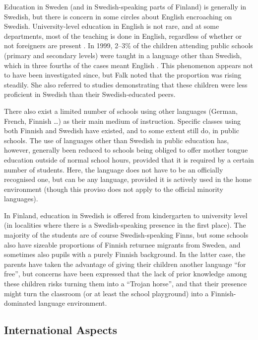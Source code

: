 \begin{multicols}{2}
Education in Sweden (and in Swedish-speaking parts of Finland) is
generally in Swedish, but there is concern in some circles about
English encroaching on Swedish. University-level education in English
is not rare, and at some departments, most of the teaching is done in
English, regardless of whether or not foreigners are present
\cite[25,~29f]{falk2001}. In 1999, 2--3\% of the children attending
public schools (primary and secondary levels) were taught in a
language other than Swedish, which in three fourths of the cases meant
English \cite[18f]{falk2001}. This phenomenon appears not to have been
investigated since, but Falk noted that the proportion was rising
steadily. She also referred to studies \cite[19]{falk2001}
demonstrating that these children were less proficient in Swedish than
their Swedish-educated peers.

There also exist a limited number of schools using other languages
(German, French, Finnish \ldots) as their main medium of
instruction. Specific classes using both Finnish and Swedish have
existed, and to some extent still do, in public schools. The use of
languages other than Swedish in public education has, however,
generally been reduced to schools being obliged to offer mother tongue
education outside of normal school hours, provided that it is required
by a certain number of students. Here, the language does not have to
be an officially recognised one, but can be any language, provided it
is actively used in the home environment (though this proviso does not
apply to the official minority languages).

In Finland, education in Swedish is offered from kindergarten to
university level (in localities where there is a Swedish-speaking
presence in the first place). The majority of the students are of
course Swedish-speaking Finns, but some schools also have sizeable
proportions of Finnish returnee migrants from Sweden, and sometimes
also pupils with a purely Finnish background. In the latter case, the
parents have taken the advantage of giving their children another
language ``for free'', but concerns have been expressed that the lack of
prior knowledge among these children risks turning them into a ``Trojan
horse'', and that their presence might turn the classroom (or at least
the school playground) into a Finnish-dominated language environment.

\subsection{International Aspects}


\end{multicols}
